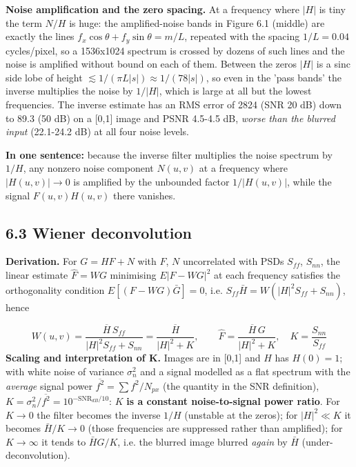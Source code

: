\documentclass[10pt,a4paper]{article}
\begin{document}
\textbf{Noise amplification and the zero spacing.} At a frequency where $|H|$ is tiny the term $N/H$ is huge: the amplified-noise bands in Figure 6.1 (middle) are exactly the lines $f_x\cos\theta+f_y\sin\theta=m/L$, repeated with the spacing $1/L=0.04$ cycles/pixel, so a 1536x1024 spectrum is crossed by dozens of such lines and the noise is amplified without bound on each of them. Between the zeros $|H|$ is a sinc side lobe of height $\lesssim1/(\pi L|s|)\approx1/(78|s|)$, so even in the 'pass bands' the inverse multiplies the noise by $1/|H|$, which is large at all but the lowest frequencies. The inverse estimate has an RMS error of 2824 (SNR 20 dB) down to 89.3 (50 dB) on a [0,1] image and PSNR 4.5-4.5 dB, \textit{worse than the blurred input} (22.1-24.2 dB) at all four noise levels.

\textbf{In one sentence:} because the inverse filter multiplies the noise spectrum by $1/H$, any nonzero noise component $N(u,v)$ at a frequency where $|H(u,v)|\to0$ is amplified by the unbounded factor $1/|H(u,v)|$, while the signal $F(u,v)H(u,v)$ there vanishes.

\subsection{6.3 Wiener deconvolution}
\textbf{Derivation.} For $G=HF+N$ with $F$, $N$ uncorrelated with PSDs $S_{ff}$, $S_{nn}$, the linear estimate $\hat F=WG$ minimising $E|F-WG|^2$ at each frequency satisfies the orthogonality condition $E[(F-WG)\bar G]=0$, i.e. $S_{ff}\bar H=W(|H|^2S_{ff}+S_{nn})$, hence

\begin{equation}W(u,v)=\frac{\overline{H}\,S_{ff}}{|H|^{2}S_{ff}+S_{nn}}=\frac{\overline{H}}{|H|^{2}+K},\qquad \hat F=\frac{\overline H\,G}{|H|^{2}+K},\quad K=\frac{S_{nn}}{S_{ff}}\end{equation}
\textbf{Scaling and interpretation of K.} Images are in [0,1] and $H$ has $H(0)=1$; with white noise of variance $\sigma_n^2$ and a signal modelled as a flat spectrum with the \textit{average} signal power $\overline{f^2}=\sum f^2/N_{px}$ (the quantity in the SNR definition), $K=\sigma_n^2/\overline{f^2}=10^{-\mathrm{SNR}_{dB}/10}$: $K$\textbf{ is a constant noise-to-signal power ratio}. For $K\to0$ the filter becomes the inverse $1/H$ (unstable at the zeros); for $|H|^2\ll K$ it becomes $\bar H/K\to0$ (those frequencies are suppressed rather than amplified); for $K\to\infty$ it tends to $\bar H G/K$, i.e. the blurred image blurred \textit{again} by $\bar H$ (under-deconvolution).
\end{document}
